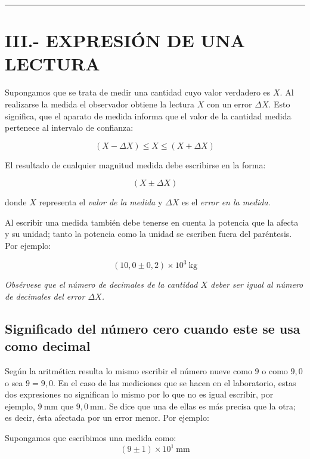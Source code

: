 \documentclass[12pt,a4paper]{article}
\begin{document}
\vspace{0.5cm}
\hrule
\vspace{0.5cm}

\section{III.- EXPRESIÓN DE UNA LECTURA}

Supongamos que se trata de medir una cantidad cuyo valor verdadero es $X$. Al realizarse la medida el observador obtiene la lectura $X$ con un error $\Delta X$. Esto significa, que el aparato de medida informa que el valor de la cantidad medida pertenece al intervalo de confianza:

\begin{equation}
(X - \Delta X) \leq X \leq (X + \Delta X) \tag{3}
\end{equation}

El resultado de cualquier magnitud medida debe escribirse en la forma:

\begin{equation}
(X \pm \Delta X) \tag{4}
\end{equation}

donde $X$ representa el \textit{valor de la medida} y $\Delta X$ es el \textit{error en la medida}.

Al escribir una medida también debe tenerse en cuenta la potencia que la afecta y su unidad; tanto la potencia como la unidad se escriben fuera del paréntesis. Por ejemplo:

\[ (10,0 \pm 0,2) \times 10^3\ \text{kg} \]

\textit{Obsérvese que el número de decimales de la cantidad $X$ deber ser igual al número de decimales del error $\Delta X$.}

\subsection*{Significado del número cero cuando este se usa como decimal}

Según la aritmética resulta lo mismo escribir el número nueve como $9$ o como $9,0$ o sea $9 = 9,0$. En el caso de las mediciones que se hacen en el laboratorio, estas dos expresiones no significan lo mismo por lo que no es igual escribir, por ejemplo, $9\ \text{mm}$ que $9,0\ \text{mm}$. Se dice que una de ellas es más precisa que la otra; es decir, ésta afectada por un error menor. Por ejemplo:

Supongamos que escribimos una medida como: 
\[ (9 \pm 1) \times 10^1\ \text{mm} \]
\end{document}
